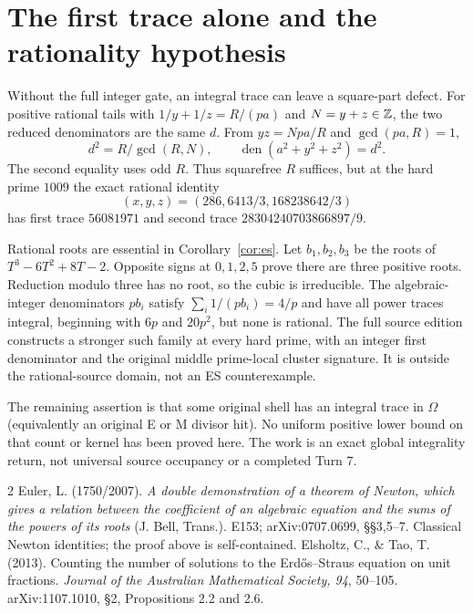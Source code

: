 \documentclass[10pt]{article}
\DeclareMathOperator{\den}{den}\DeclareMathOperator{\rank}{rank}
\begin{document}
\section*{The first trace alone and the rationality hypothesis}
Without the full integer gate, an integral trace can leave a square-part defect.
For positive rational tails with $1/y+1/z=R/(pa)$ and $N=y+z\in\mathbb Z$, the two
reduced denominators are the same $d$. From $yz=Npa/R$ and $\gcd(pa,R)=1$,
\[
 \boxed{d^2=R/\gcd(R,N),\qquad \den(a^2+y^2+z^2)=d^2.}
\]
The second equality uses odd $R$. Thus squarefree $R$ suffices, but at the hard
prime $1009$ the exact rational identity
\[
 (x,y,z)=(286,6413/3,168238642/3)
\]
has first trace $56081971$ and second trace $28304240703866897/9$.

Rational roots are essential in Corollary~\ref{cor:es}. Let $b_1,b_2,b_3$ be the
roots of $T^3-6T^2+8T-2$. Opposite signs at $0,1,2,5$ prove there are three
positive roots. Reduction modulo three has no root, so the cubic is irreducible.
The algebraic-integer denominators $pb_i$ satisfy $\sum_i1/(pb_i)=4/p$ and have
all power traces integral, beginning with $6p$ and $20p^2$, but none is rational.
The full source edition constructs a stronger such family at every hard prime,
with an integer first denominator and the original middle prime-local cluster
signature. It is outside the rational-source domain, not an ES counterexample.

The remaining assertion is that some original shell has an integral trace in
$\Omega$ (equivalently an original E or M divisor hit). No uniform positive
lower bound on that count or kernel has been proved here. The work is an exact
global integrality return, not universal source occupancy or a completed Turn 7.

\begin{thebibliography}{2}\small
{} Euler, L. (1750/2007). \emph{A double demonstration of a theorem of
Newton, which gives a relation between the coefficient of an algebraic equation
and the sums of the powers of its roots} (J. Bell, Trans.). E153; arXiv:0707.0699,
\S\S3,5--7. Classical Newton identities; the proof above is self-contained.
 Elsholtz, C., \& Tao, T. (2013). Counting the number of solutions to
the Erd\H{o}s--Straus equation on unit fractions. \emph{Journal of the Australian
Mathematical Society, 94}, 50--105. arXiv:1107.1010, \S2, Propositions 2.2 and 2.6.
\end{thebibliography}
\end{document}
